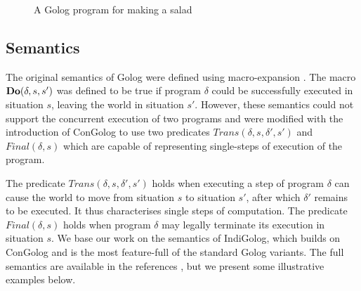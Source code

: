 %
\begin{figure}
\begin{centering}
\par\end{centering}

\caption{A Golog program for making a salad\label{fig:Background:Golog:MakeSalad}}

\end{figure}



\subsection{Semantics}

The original semantics of Golog were defined using macro-expansion
\citep{levesque97golog}. The macro $\mathbf{Do}(\delta,s,s')$ was defined
to be true if program $\delta$ could be successfully executed in
situation $s$, leaving the world in situation $s'$. However, these
semantics could not support the concurrent execution of two programs
and were modified with the introduction of ConGolog \citep{giacomo00congolog}
to use two predicates $Trans(\delta,s,\delta',s')$ and $Final(\delta,s)$
which are capable of representing single-steps of execution of the
program.

The predicate $Trans(\delta,s,\delta',s')$ holds when executing a
step of program $\delta$ can cause the world to move from situation
$s$ to situation $s'$, after which $\delta'$ remains to be executed.
It thus characterises single steps of computation. The predicate $Final(\delta,s)$
holds when program $\delta$ may legally terminate its execution in
situation $s$. We base our work on the semantics of IndiGolog, which
builds on ConGolog and is the most feature-full of the standard Golog
variants. The full semantics are available in the references \citep{giacomo00congolog,giacomo99indigolog},
but we present some illustrative examples below.

